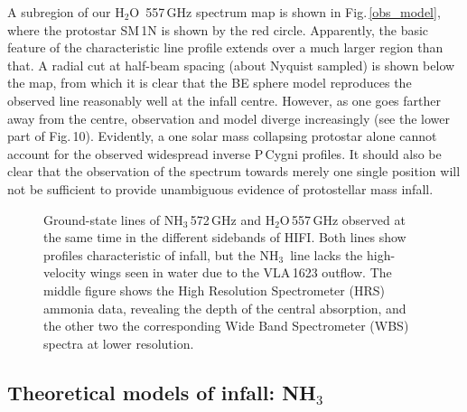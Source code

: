 \documentclass{aa}
\newcommand{\kms}{km\,s$^{-1}$}       %
\newcommand{\vlsr}{$\upsilon_{\rm LSR}$}        %
\newcommand{\ta}{$T_{\rm A}$}        %
\newcommand{\tmb}{$T_{\rm mb}$}
\newcommand{\water}{H$_{2}$O}
\newcommand{\ammonia}{{\rm NH}$_3$}
\newcommand{\roa}{$\rho \, {\rm Oph \, A}$}
\newcommand{\asec}{$^{\prime \prime}$}
\begin{document}
A subregion of our \water\ 557\,GHz spectrum map is shown in Fig.\,\ref{obs_model}, where the protostar SM\,1N is shown by the red circle. Apparently, the basic feature of the characteristic line profile extends over a much larger region than that. A radial cut at half-beam spacing (about Nyquist sampled) is shown below the map, from which it is clear that the BE sphere model reproduces the observed line reasonably well at the infall centre. However, as one goes farther away from the centre, observation and model diverge increasingly (see the lower part of Fig.\,10). Evidently, a one solar mass collapsing protostar  alone cannot account for the observed widespread inverse P\,Cygni profiles.  It should also be clear that the observation of the spectrum towards merely one single position will not be sufficient to provide unambiguous evidence of protostellar mass infall.

\begin{figure*}
  \caption{{\bf Upper:} Subregion of the observed 557\,GHz \water\ map of \roa. The scales of \vlsr\ and \ta\ are shown in the upper right corner. The {\it Herschel} beam at FWHM is indicated in the lower right corner (38\asec, grey). The red circle shows the size of the Bonnor-Ebert sphere model of SM\,1N discussed in the text. {\bf Lower:} Theoretical line profiles (red) are compared with the observed profiles (histograms). The spectra are half-beam spaced. The intensity is given in the \tmb\ scale, where $\eta_{\rm mb}=0.62$. The absorption dip is centred on \vlsr\,=\,+3.3\,\kms.}
  \label{obs_model}
\end{figure*}

\begin{figure}
  \caption{Ground-state lines of \ammonia\,572\,GHz and \water\,557\,GHz  observed at the same time in the different sidebands of HIFI. Both lines show profiles characteristic of infall, but the \ammonia\ line lacks the high-velocity wings seen in water due to the VLA\,1623 outflow. The middle figure shows the High Resolution Spectrometer (HRS) ammonia data, revealing the depth of the central absorption, and the other two the corresponding Wide Band Spectrometer (WBS) spectra at lower resolution.
        }
  \label{nh3_profile}
\end{figure}

\subsection{Theoretical models of infall: \ammonia}
\end{document}
